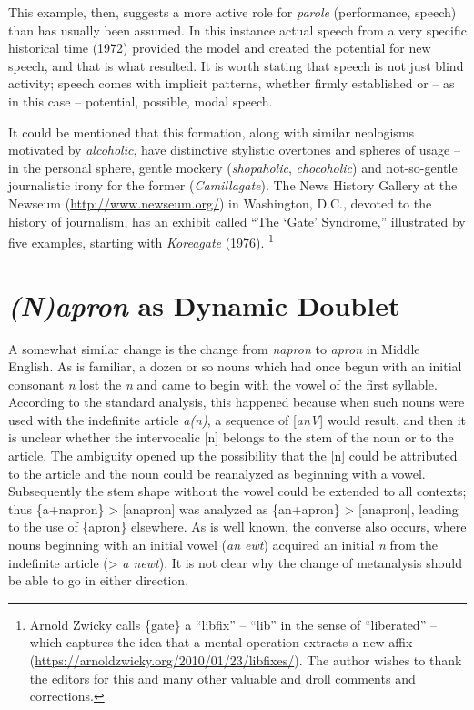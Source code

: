 \documentclass[output=paper,
modfonts
]{LSP/langsci}
\begin{document}
This example, then, suggests a more active role for \emph{parole}
(performance, speech) than has usually been assumed. In this instance
actual speech from a very specific historical time (1972) provided the
model and created the potential for new speech, and that is what
resulted. It is worth stating that speech is not just blind activity;
speech comes with implicit patterns, whether firmly established or -- as
in this case -- potential, possible, modal speech.

It could be mentioned that this formation, along with similar neologisms
motivated by \emph{alcoholic}, have distinctive stylistic overtones and
spheres of usage -- in the personal sphere, gentle mockery
(\emph{shopaholic}, \emph{chocoholic}) and not-so-gentle journalistic
irony for the former (\emph{Camillagate}). The News History Gallery at
the Newseum (\url{http://www.newseum.org/}) in Washington, D.C., devoted
to the history of journalism, has an exhibit called ``The `Gate'
Syndrome,'' illustrated by five examples, starting with \emph{Koreagate}
(1976). \footnote{
  Arnold Zwicky calls \{gate\} a ``libfix'' -- ``lib'' in the sense of
  ``liberated'' -- which captures the idea that a mental operation
  extracts a new affix
  (\url{https://arnoldzwicky.org/2010/01/23/libfixes/}). The author
  wishes to thank the editors for this and many other valuable and droll
  comments and corrections.}

\section{\emph{(N)apron} as Dynamic Doublet}

A somewhat similar change is the change from \emph{napron} to
\emph{apron} in Middle English. As is familiar, a dozen or so nouns
which had once begun with an initial consonant \emph{n} lost the
\emph{n} and came to begin with the vowel of the first syllable.
According to the standard analysis, this happened because when such
nouns were used with the indefinite article \emph{a(n)}, a sequence of
{[}\emph{anV}{]} would result, and then it is unclear whether the
intervocalic {[n]} belongs to the stem of the noun or to the
article. The ambiguity opened up the possibility that the {[}n{]} could
be attributed to the article and the noun could be reanalyzed as
beginning with a vowel. Subsequently the stem shape without the vowel
could be extended to all contexts; thus \{a+napron\} \textgreater{}
{[}anapron{]} was analyzed as \{an+apron\} \textgreater{} {[}anapron{]},
leading to the use of \{apron\} elsewhere. As is well known, the
converse also occurs, where nouns beginning with an initial vowel
(\emph{an ewt}) acquired an initial \emph{n} from the indefinite article
(\textgreater{} \emph{a newt}). It is not clear why the change of
metanalysis should be able to go in either direction.
\end{document}
